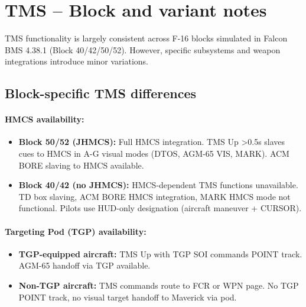 \documentclass[11pt, a4paper, twoside]{report}
\newenvironment{hotastable}[1]{%
	\small
	\setlength{\tabcolsep}{2pt}
	\renewcommand{\arraystretch}{1.25}
	\begin{longtable}{L{1.00cm} L{0.90cm} L{0.90cm} L{3.30cm} L{6.40cm} L{1.40cm} L{2.10cm}}
		\caption{#1}\\
		\rowcolor{headerblue}
		\multicolumn{1}{>{\centering\arraybackslash}p{1.00cm}}{\textbf{\color{white}Mode}} &
		\multicolumn{1}{>{\centering\arraybackslash}p{0.90cm}}{\textbf{\color{white}Dir.}} &
		\multicolumn{1}{>{\centering\arraybackslash}p{0.90cm}}{\textbf{\color{white}Act.}} &
		\multicolumn{1}{>{\centering\arraybackslash}p{3.30cm}}{\textbf{\color{white}Function}} &
		\multicolumn{1}{>{\centering\arraybackslash}p{6.40cm}}{\textbf{\color{white}Effect / Nuance}} &
		\multicolumn{1}{>{\centering\arraybackslash}p{1.40cm}}{\textbf{\color{white}Dash34}} &
		\multicolumn{1}{>{\centering\arraybackslash}p{2.10cm}}{\textbf{\color{white}Train.}} \\
		\endfirsthead
		\rowcolor{headerblue}
		\multicolumn{1}{>{\centering\arraybackslash}p{1.00cm}}{\textbf{\color{white}Mode}} &
		\multicolumn{1}{>{\centering\arraybackslash}p{0.90cm}}{\textbf{\color{white}Dir.}} &
		\multicolumn{1}{>{\centering\arraybackslash}p{0.90cm}}{\textbf{\color{white}Act.}} &
		\multicolumn{1}{>{\centering\arraybackslash}p{3.30cm}}{\textbf{\color{white}Function}} &
		\multicolumn{1}{>{\centering\arraybackslash}p{6.40cm}}{\textbf{\color{white}Effect / Nuance}} &
		\multicolumn{1}{>{\centering\arraybackslash}p{1.40cm}}{\textbf{\color{white}Dash34}} &
		\multicolumn{1}{>{\centering\arraybackslash}p{2.10cm}}{\textbf{\color{white}Train.}} \\
		\endhead
		\multicolumn{7}{r}{\small\emph{Continued on next page}}\\
		\endfoot
		\endlastfoot
	}{%
	\end{longtable}
}
\begin{document}

\newpage
\section{TMS -- Block and variant notes}
\label{sec:C4-S6}

TMS functionality is largely consistent across F-16 blocks simulated in Falcon BMS 4.38.1 (Block 40/42/50/52). However, specific subsystems and weapon integrations introduce minor variations.

\subsection{Block-specific TMS differences}
\label{sec:C4-S6-S1}

\paragraph{HMCS availability:}
\begin{itemize}
    \item \textbf{Block 50/52 (JHMCS):} Full HMCS integration. TMS Up >0.5s slaves cues to HMCS in A-G visual modes (DTOS, AGM-65 VIS, MARK). ACM BORE slaving to HMCS available.
    \item \textbf{Block 40/42 (no JHMCS):} HMCS-dependent TMS functions unavailable. TD box slaving, ACM BORE HMCS integration, MARK HMCS mode not functional. Pilots use HUD-only designation (aircraft maneuver + CURSOR).
\end{itemize}

\paragraph{Targeting Pod (TGP) availability:}
\begin{itemize}
    \item \textbf{TGP-equipped aircraft:} TMS Up with TGP SOI commands POINT track. AGM-65 handoff via TGP available.
    \item \textbf{Non-TGP aircraft:} TMS commands route to FCR or WPN page. No TGP POINT track, no visual target handoff to Maverick via pod.
\end{itemize}
\end{document}
